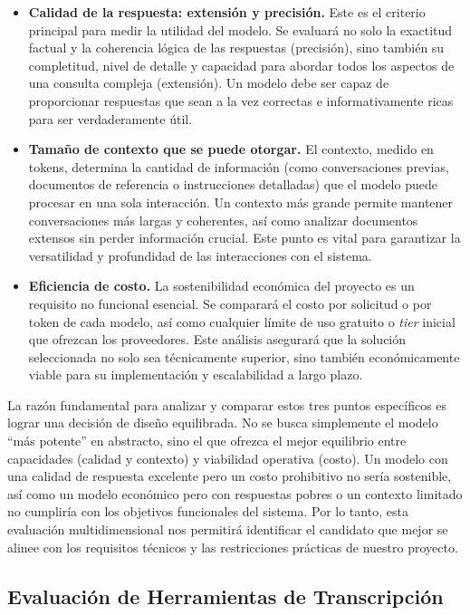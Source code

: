 \begin{itemize}
    \item \textbf{Calidad de la respuesta: extensión y precisión.} Este es el criterio principal para medir la utilidad del modelo. Se evaluará no solo la exactitud factual y la coherencia lógica de las respuestas (precisión), sino también su completitud, nivel de detalle y capacidad para abordar todos los aspectos de una consulta compleja (extensión). Un modelo debe ser capaz de proporcionar respuestas que sean a la vez correctas e informativamente ricas para ser verdaderamente útil.

    \item \textbf{Tamaño de contexto que se puede otorgar.} El contexto, medido en tokens, determina la cantidad de información (como conversaciones previas, documentos de referencia o instrucciones detalladas) que el modelo puede procesar en una sola interacción. Un contexto más grande permite mantener conversaciones más largas y coherentes, así como analizar documentos extensos sin perder información crucial. Este punto es vital para garantizar la versatilidad y profundidad de las interacciones con el sistema.

    \item \textbf{Eficiencia de costo.} La sostenibilidad económica del proyecto es un requisito no funcional esencial. Se comparará el costo por solicitud o por token de cada modelo, así como cualquier límite de uso gratuito o \textit{tier} inicial que ofrezcan los proveedores. Este análisis asegurará que la solución seleccionada no solo sea técnicamente superior, sino también económicamente viable para su implementación y escalabilidad a largo plazo.
\end{itemize}

La razón fundamental para analizar y comparar estos tres puntos específicos es lograr una decisión de diseño equilibrada. No se busca simplemente el modelo ``más potente'' en abstracto, sino el que ofrezca el mejor equilibrio entre capacidades (calidad y contexto) y viabilidad operativa (costo). Un modelo con una calidad de respuesta excelente pero un costo prohibitivo no sería sostenible, así como un modelo económico pero con respuestas pobres o un contexto limitado no cumpliría con los objetivos funcionales del sistema. Por lo tanto, esta evaluación multidimensional nos permitirá identificar el candidato que mejor se alinee con los requisitos técnicos y las restricciones prácticas de nuestro proyecto.


\subsection{Evaluación de Herramientas de Transcripción}
\label{subsection:3-RNF6: Evaluación de Herramientas de Transcripción}

